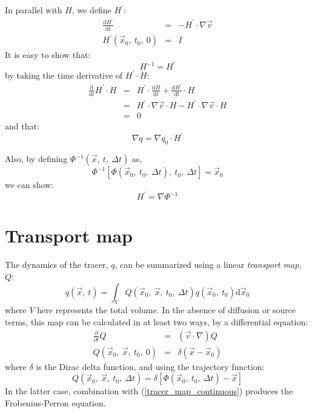 \documentclass[11pt]{article}
\begin{document}
In parallel with $H$, we define $H^\prime$:
\begin{eqnarray}
\frac{\mathrm d H^\prime}{\mathrm d t} & = & -H^\prime \cdot \nabla \vec v\\
\label{inverse_deformation_matrix}
H^\prime(\vec x_0,~t_0,~0) & = & I
\end{eqnarray}
It is easy to show that:
\begin{equation}
H^{-1}=H^\prime
\end{equation}
by taking the time derivative of $H^\prime \cdot H$:
\begin{eqnarray}
\frac{\mathrm d}{\mathrm d t} H^\prime \cdot H & = & 
		H^\prime \cdot \frac{\mathrm d H}{\mathrm d t} +
		\frac{\mathrm d H^\prime}{\mathrm d t} \cdot H\\
		& = & H^\prime \cdot \nabla \vec v \cdot H 
		- H^\prime \cdot \nabla \vec v \cdot H \\
		& = & 0
\end{eqnarray}
and that:
\begin{equation}
\nabla q = \nabla q_0 \cdot H^\prime
\end{equation}

Also, by defining $\Phi^{-1}(\vec x,~t,~\Delta t)$ as,
\begin{equation}
\Phi^{-1}[\Phi(\vec x_0,~t_0,~\Delta t),~t_0,~\Delta t]=\vec x_0
\end{equation}
we can show:
\begin{equation}
H^\prime=\nabla \Phi^{-1}
\end{equation}

\section{Transport map}

\label{map_section}

The dynamics of the tracer, $q$, can be summarized using a linear
{\it transport map}, $Q$:
\begin{equation}
	q(\vec x,~t)=\int_{V} Q(\vec x_0,~\vec x,~t_0,~\Delta t) q(\vec x_0,~t_0) \mathrm d \vec x_0
\label{tracer_map_continuous}
\end{equation}
where $V$ here represents the total volume.
In the absence of diffusion or source terms, this map can be calculated in
at least two ways, by a differential equation: 
\begin{eqnarray}
	\frac{\partial}{\partial t} Q & = & (\vec v \cdot \nabla) Q 
\label{tracer_map_continuous1}\\
Q(\vec x_0,~\vec x,~t_0,~0) & = & \delta(\vec x-\vec x_0) 
\label{tracer_map_continuous2}
\end{eqnarray}
where $\delta$ is the Dirac delta function, and using the trajectory function:
\begin{equation}
Q(\vec x_0,~\vec x,~t_0,~\Delta t) = \delta[\Phi(\vec x_0,~t_0,~\Delta t)-\vec x]
\label{tracer_map_continuous3}
\end{equation}
In the latter case, combination with (\ref{tracer_map_continuous}) produces the
Frobenius-Perron equation. \citep{Ott1993}
\end{document}
